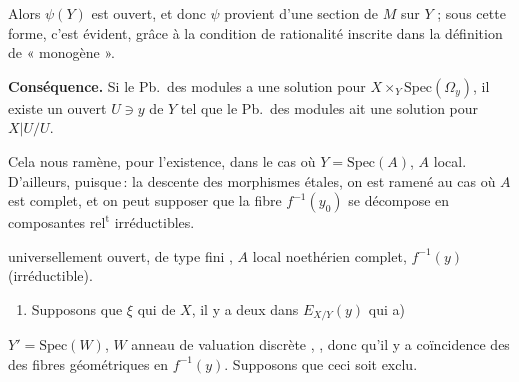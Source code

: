 \documentclass[11pt,a4paper]{article}
\begin{document}
Alors \struck{\ill{}} $\psi(Y)$ est \struck{\ill{}} ouvert, \struck{\ill{}}
 et donc $\psi$ provient d'une section de $M$ sur $Y$ ;
sous cette forme, c'est évident, grâce à la condition de rationalité inscrite
dans la définition de « monogène ».

\textbf{Conséquence.} Si le Pb.\ des modules a une solution pour
$X \times_Y \mathrm{Spec}(\Omega_y)$, il existe un ouvert $U \ni y$ de $Y$ tel
que le Pb.\ des modules ait une solution pour $X|U / U$.


Cela nous ramène, pour l'existence, dans le cas où 
$Y = \mathrm{Spec}(A)$, $A$ local.  D'ailleurs, puisque\,: la descente des morphismes étales, on est ramené
au cas où $A$ est complet, et on peut supposer que la fibre \ill{}
$f^{-1}(y_0)$ \ill{} se décompose en composantes $\mathrm{rel}^{\mathrm{t}}$
irréductibles.



 universellement ouvert, de type fini , $A$ local noethérien complet, $f^{-1}(y)$
(irréductible).



\begin{enumerate}
\item[(i)] Supposons que  \ill{} $\xi$ qui
\ill{} \ill{} de $X$, il y a deux \ill{} dans $E_{X/Y}(y)$ qui \ill{} \ill{}
a) \ill{}
\end{enumerate}


\ill{} $Y' = \mathrm{Spec}(W)$, $W$ anneau de valuation discrète , \struck{\ill{}} , donc qu'il y a coïncidence des
\ill{} des fibres géométriques en $f^{-1}(y)$. Supposons que ceci soit exclu.
\end{document}
